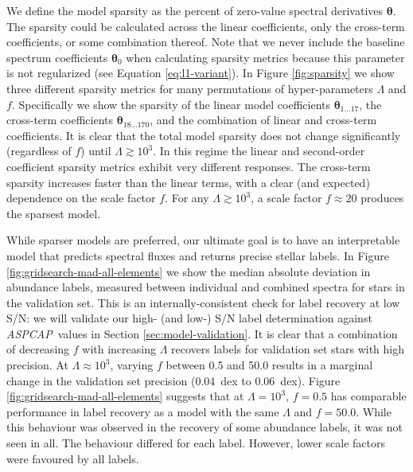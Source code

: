 \documentclass[12pt,preprint]{aastex6}
\newcommand{\project}[1]{\textsl{#1}}
\newcommand{\acronym}[1]{{\small{#1}}}
\newcommand{\aspcap}{\project{\acronym{ASPCAP}}}
\newcommand{\Dvector}[1]{\boldsymbol{#1}}
\newcommand{\vectheta}{\Dvector{\theta}}
\begin{document}
We define the model sparsity as the percent of zero-value spectral derivatives 
$\vectheta$.  The sparsity could be calculated across the linear 
coefficients, only the cross-term coefficients, or some combination thereof.  
Note that we never include the baseline spectrum coefficients $\vectheta_0$ when 
calculating sparsity metrics because this parameter is not regularized (see 
Equation \ref{eq:l1-variant}).  In Figure \ref{fig:sparsity} we show three 
different sparsity metrics for many permutations of hyper-parameters $\Lambda$ 
and $f$.  Specifically we show the sparsity of the linear model coefficients 
$\vectheta_{1...17}$, the cross-term coefficients $\vectheta_{18...170}$, and 
the combination of linear and cross-term coefficients.  It is clear that the 
total model sparsity does not change significantly (regardless of $f$) until 
$\Lambda \gtrsim 10^3$.  In this regime the linear and second-order coefficient 
sparsity metrics exhibit very different responses.  The cross-term sparsity 
increases faster than the linear terms, with a clear (and expected) dependence 
on the scale factor $f$.  For any $\Lambda \gtrsim 10^3$, a scale factor 
$f \approx 20$ produces the sparsest model.


While sparser models are preferred, our ultimate goal is to have an 
interpretable model that predicts spectral fluxes and returns precise stellar
labels.  In Figure \ref{fig:gridsearch-mad-all-elements} we show the median
absolute deviation in abundance labels, measured between individual and combined
spectra for stars in the validation set.  This is an internally-consistent
check for label recovery at low S/N: we will validate our high- (and low-) S/N
label determination against \aspcap\ values in Section \ref{sec:model-validation}.  It is
clear that a combination of decreasing $f$ with increasing $\Lambda$ recovers
labels for validation set stars with high precision.  At $\Lambda \approx 10^3$,
varying $f$ between 0.5 and 50.0 results in a marginal change in the validation
set precision (0.04~dex to 0.06~dex).  Figure \ref{fig:gridsearch-mad-all-elements}
suggests that at $\Lambda = 10^3$, $f = 0.5$ has comparable performance in
label recovery as a model with the same $\Lambda$ and $f = 50.0$.  While this
behaviour was observed in the recovery of some abundance labels, it was not seen in all. 
The behaviour differed for each label.  However, lower scale factors were favoured by all labels.
\end{document}
